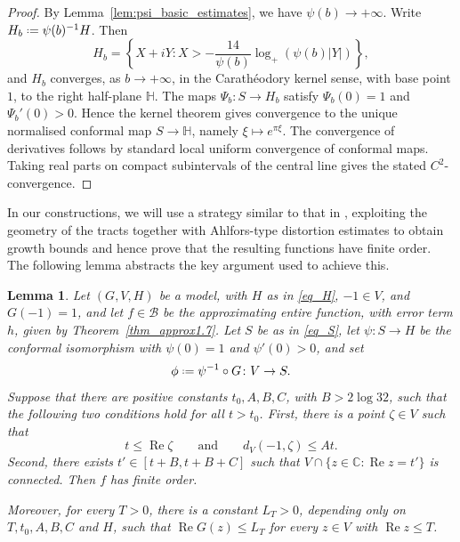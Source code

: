 \documentclass[a4paper, 11pt, reqno]{amsart}
\numberwithin{equation}{section}
\theoremstyle{plain}
\newtheorem{lemma}[theorem]{Lemma}
\newcommand*{\defeq}{\mathrel{\vcenter{\baselineskip0.5ex \lineskiplimit0pt
 \hbox{\scriptsize.}\hbox{\scriptsize.}}}=}
\theoremstyle{remark}
\newcommand{\HH}{{\mathbb{H}}}
\newcommand{\C}{{\mathbb{C}}}
\newcommand{\Rea}{\operatorname{Re }}
\begin{document}
\begin{proof}
By Lemma~\ref{lem:psi_basic_estimates}, we have \(\psi(b)\to+\infty\). Write \(H_b\defeq \psi(b)^{-1}H\). Then
		\[
		H_b=
		\left\{X+iY:
		X>-\frac{14}{\psi(b)}\log_+(\psi(b)|Y|)
		\right\},
		\]
		and \(H_b\) converges, as \(b\to+\infty\), in the Carath\'eodory kernel sense, with base point \(1\), to the right half-plane \(\HH\). The maps \(\Psi_b:S\to H_b\) satisfy \(\Psi_b(0)=1\) and \(\Psi_b'(0)>0\). Hence the kernel theorem gives convergence to the unique normalised conformal map \(S\to\HH\), namely \(\xi\mapsto e^{\pi\xi}\).
	The convergence of derivatives follows by standard local uniform convergence
	of conformal maps. Taking real parts on compact subintervals of the central
	line gives the stated \(C^2\)-convergence.
\end{proof}

In our constructions, we will use a strategy similar to that in \cite[Section~5]{letidave_variations}, exploiting the geometry of the tracts together with Ahlfors-type distortion estimates to obtain growth bounds and hence prove that the resulting functions have finite order. The following lemma abstracts the key argument used to achieve this.

\begin{lemma}
	\label{lem:finite-order-criterion}
	Let $(G,V,H)$ be a model, with $H$ as in \eqref{eq_H}, \(-1\in V\), and \(G(-1)=1\), and let
	$f\in\mathcal B$ be the approximating entire function, with error term $h$, given by
	Theorem~\ref{thm_approx1.7}. Let $S$ be as in \eqref{eq_S}, let $\psi\colon S\to H$ be the conformal isomorphism with
	$\psi(0)=1$ and $\psi'(0)>0$, and set
	\[
	\phi\defeq \psi^{-1}\circ G\colon V\to S.
	\]
	Suppose that there are positive constants $t_0, A, B, C$, with $B > 2 \log 32$, such that the following two conditions hold for all $t > t_0$. First, there is a point $\zeta \in V$ such that 
	\[
	t\le \Rea \zeta 
	\qquad\text{and}\qquad
	d_V(-1,\zeta)\le At.
	\]
	Second, there exists $t' \in [t + B, t + B + C]$ such that $V \cap \{z\in\C:\Rea z=t'\}$ is connected.
	Then $f$ has finite order.
	
Moreover, for every \(T>0\), there is a constant
\(L_T>0\), depending only on \(T,t_0,A,B,C\) and \(H\), such that
$
\Rea G(z)\le L_T
$
for every \(z\in V\) with \(\Rea z\le T\).
\end{lemma}
\end{document}
